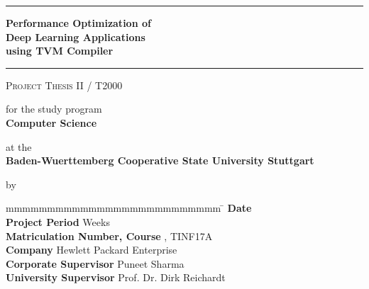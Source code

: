 \hfill
{}

\vfill
\begin{center}
	\rule{\textwidth}{1pt}
	{
		\Huge
		\bfseries
		Performance Optimization of \\ Deep Learning Applications \\ using TVM Compiler
		\par
	}
	\vspace{-0.2cm} 
	\rule{\textwidth}{1pt}

	\vfill

	\textsc{Project Thesis II / T2000}
	
	\vfill

	for the study program \\ \textbf{Computer Science}
	
	at the \\ \textbf{Baden-Wuerttemberg Cooperative State University Stuttgart}
	
	by \\ \textbf{\@author}
\end{center}

\vfill

\begin{tabbing}
	mmmmmmmmmmmmmmmmmmmmmmmmmm				\= \kill
	\textbf{Date}      						\> \@date \\
	\textbf{Project Period} 				 Weeks \\
	\textbf{Matriculation Number, Course}  	, TINF17A \\
	\textbf{Company}                        \> Hewlett Packard Enterprise \\
	\textbf{Corporate Supervisor}           \> Puneet Sharma \\
	\textbf{University Supervisor}          \> Prof. Dr. Dirk Reichardt
\end{tabbing}
